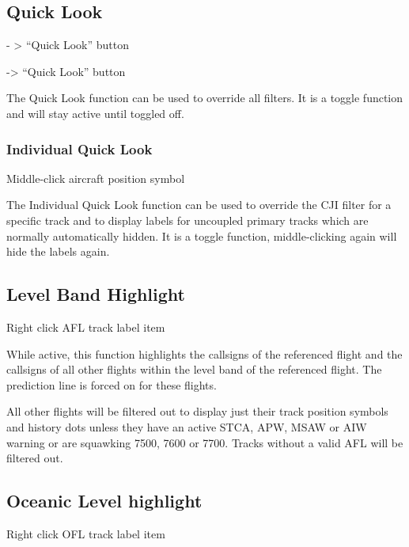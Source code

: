 \documentclass[a4paper,oneside,11pt]{memoir}
\begin{document}
\subsection{Quick Look}
\label{win:qlook}

 - > “Quick Look” button

 -> “Quick Look” button 


\bigskip

The Quick Look function can be used to override all filters. It is a toggle function and will stay active until toggled off.

\subsubsection{Individual Quick Look}

Middle-click aircraft position symbol

\bigskip

The Individual Quick Look function can be used to override the CJI filter for a specific track and to display labels for uncoupled primary tracks which are normally automatically hidden. It is a toggle function, middle-clicking again will hide the labels again.

\subsection{Level Band Highlight}\label{func:lbh}

Right click AFL track label item 

\bigskip

While active, this function highlights the callsigns of the referenced flight and the callsigns of all other flights within the level band of the referenced flight. The prediction line is forced on for these flights.

\bigskip

All other flights will be filtered out to display just their track position symbols and history dots unless they have an active STCA, APW, MSAW or AIW warning or are squawking 7500, 7600 or 7700. Tracks without a valid AFL will be filtered out.

\subsection{Oceanic Level highlight}\label{func:olh}

Right click OFL track label item 
\end{document}
